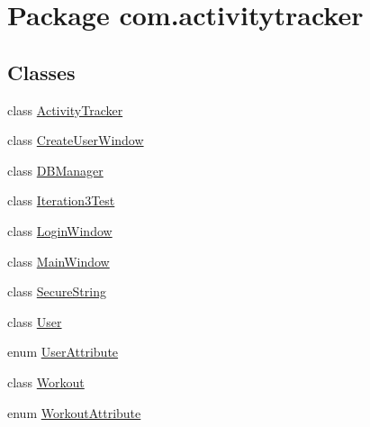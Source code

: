 \hypertarget{namespacecom_1_1activitytracker}{}\section{Package com.\+activitytracker}
\label{namespacecom_1_1activitytracker}
\subsection*{Classes}
\begin{DoxyCompactItemize}
\item 
class \mbox{\hyperlink{classcom_1_1activitytracker_1_1_activity_tracker}{Activity\+Tracker}}
\item 
class \mbox{\hyperlink{classcom_1_1activitytracker_1_1_create_user_window}{Create\+User\+Window}}
\item 
class \mbox{\hyperlink{classcom_1_1activitytracker_1_1_d_b_manager}{D\+B\+Manager}}
\item 
class \mbox{\hyperlink{classcom_1_1activitytracker_1_1_iteration3_test}{Iteration3\+Test}}
\item 
class \mbox{\hyperlink{classcom_1_1activitytracker_1_1_login_window}{Login\+Window}}
\item 
class \mbox{\hyperlink{classcom_1_1activitytracker_1_1_main_window}{Main\+Window}}
\item 
class \mbox{\hyperlink{classcom_1_1activitytracker_1_1_secure_string}{Secure\+String}}
\item 
class \mbox{\hyperlink{classcom_1_1activitytracker_1_1_user}{User}}
\item 
enum \mbox{\hyperlink{enumcom_1_1activitytracker_1_1_user_attribute}{User\+Attribute}}
\item 
class \mbox{\hyperlink{classcom_1_1activitytracker_1_1_workout}{Workout}}
\item 
enum \mbox{\hyperlink{enumcom_1_1activitytracker_1_1_workout_attribute}{Workout\+Attribute}}
\end{DoxyCompactItemize}
